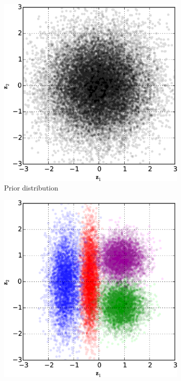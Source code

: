 \documentclass[MAL,biber]{nowfnt} %
\begin{document}
\begin{figure}[t]
	\centering
	\begin{subfigure}[]{0.33\textwidth}
		\centering
		\includegraphics[width=1\textwidth]{figures/iaf/xor_prior.png}
		\caption{Prior distribution}
	\end{subfigure}%
	\begin{subfigure}[]{0.33\textwidth}
		\centering
		\includegraphics[width=1\textwidth]{figures/iaf/xor_vae.png}

\end{subfigure}
\end{figure}
\end{document}
